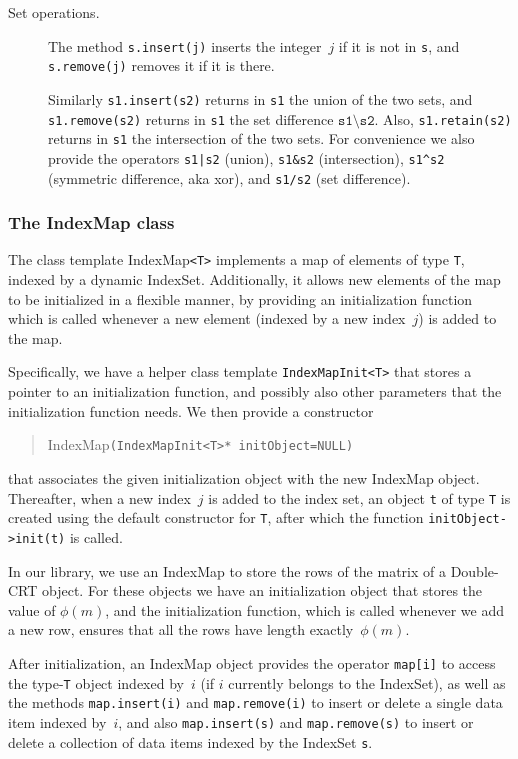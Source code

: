 \documentclass[14pt]{extarticle}
\def\IndexSet{\textsf{IndexSet}}
\def\IndexMap{\textsf{IndexMap}}
\begin{document}
\begin{description}
\item[Set operations.] 
The method \texttt{s.insert(j)} inserts the integer~$j$ if it is not
in \texttt{s}, and \texttt{s.remove(j)} removes it if it is there.

Similarly \texttt{s1.insert(s2)} returns in \texttt{s1} the union of
the two sets, and \texttt{s1.remove(s2)} returns in \texttt{s1} the
set difference $\mathtt{s1\setminus s2}$. Also, \texttt{s1.retain(s2)}
returns in \texttt{s1} the intersection of the two sets.
For convenience we also provide the operators \texttt{s1|s2} (union),
\texttt{s1\&s2} (intersection), \texttt{s1}\texttt{\^}\texttt{s2}
(symmetric difference, aka xor), and \texttt{s1/s2} (set difference). 
\end{description}

\subsubsection{The {\IndexMap} class}
The class template {\IndexMap}\texttt{<T>} implements a map of elements
of type \texttt{T}, indexed by a dynamic {\IndexSet}.  Additionally, it
allows new elements of the map to be initialized in a flexible manner,
by providing an initialization function which is called whenever a new
element (indexed by a new index~$j$) is added to the map. 

Specifically, we have a helper class template \texttt{IndexMapInit<T>}
that stores a pointer to an initialization function, and possibly also
other parameters that the initialization function needs. We 
then provide a constructor 
\begin{quote}
{\IndexMap}\texttt{(IndexMapInit<T>*
initObject=NULL)} 
\end{quote}
that associates the given initialization object
with the new {\IndexMap} object.
Thereafter, when a new index~$j$ is added to the index set, an object
\texttt{t} of type \texttt{T} is created using the default constructor
for \texttt{T}, after which the function \texttt{initObject->init(t)}
is called.

In our library, we use an {\IndexMap} to store the rows of the matrix
of a Double-CRT object. For these objects we have an initialization
object that stores the value of $\phi(m)$, and the initialization
function, which is called whenever we add a new row, ensures that all
the rows have length exactly~$\phi(m)$.

After initialization, an {\IndexMap} object provides the operator
\texttt{map[i]} to access the type-\texttt{T} object indexed by~$i$
(if $i$ currently belongs to the {\IndexSet}), as well as the methods
\texttt{map.insert(i)} and \texttt{map.remove(i)} to insert or delete
a single data item indexed by~$i$, and also \texttt{map.insert(s)} and
\texttt{map.remove(s)}  to insert or delete a collection of data items
indexed by the {\IndexSet} \texttt{s}.
\end{document}

